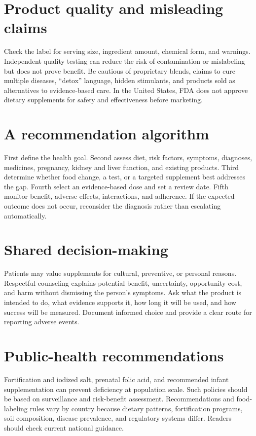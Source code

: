 \section{Product quality and misleading claims}
Check the label for serving size, ingredient amount, chemical form, and warnings. Independent quality testing can reduce the risk of contamination or mislabeling but does not prove benefit. Be cautious of proprietary blends, claims to cure multiple diseases, ``detox'' language, hidden stimulants, and products sold as alternatives to evidence-based care. In the United States, FDA does not approve dietary supplements for safety and effectiveness before marketing. \cite{uspVerified,fdaSupplements}

\section{A recommendation algorithm}
First define the health goal. Second assess diet, risk factors, symptoms, diagnoses, medicines, pregnancy, kidney and liver function, and existing products. Third determine whether food change, a test, or a targeted supplement best addresses the gap. Fourth select an evidence-based dose and set a review date. Fifth monitor benefit, adverse effects, interactions, and adherence. If the expected outcome does not occur, reconsider the diagnosis rather than escalating automatically.

\section{Shared decision-making}
Patients may value supplements for cultural, preventive, or personal reasons. Respectful counseling explains potential benefit, uncertainty, opportunity cost, and harm without dismissing the person's symptoms. Ask what the product is intended to do, what evidence supports it, how long it will be used, and how success will be measured. Document informed choice and provide a clear route for reporting adverse events. \cite{odsSafety}

\section{Public-health recommendations}
Fortification and iodized salt, prenatal folic acid, and recommended infant supplementation can prevent deficiency at population scale. Such policies should be based on surveillance and risk-benefit assessment. Recommendations and food-labeling rules vary by country because dietary patterns, fortification programs, soil composition, disease prevalence, and regulatory systems differ. Readers should check current national guidance. \cite{whoSaltIodization,cdcFolate,cdcInfantVitaminD,cdcInfantIron,fdaDV}

